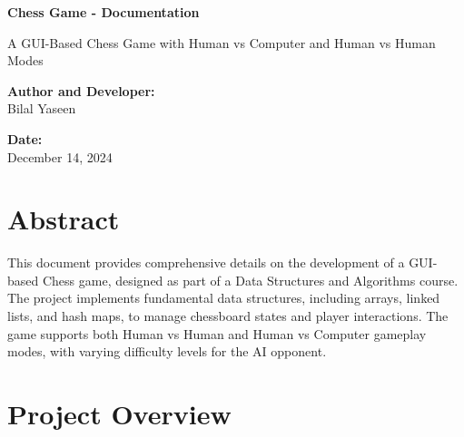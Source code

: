\documentclass[a4paper,12pt]{article}
\begin{document}
\thispagestyle{empty} 

\vspace*{1cm} 

\begin{center}
   \Huge \textbf{Chess Game - Documentation}

    \vspace{0.5cm}
    \Large A GUI-Based Chess Game with Human vs Computer and Human vs Human Modes

    \vspace{1.5cm}
    \textbf{Author and Developer:} \\
    Bilal Yaseen
    
    \vspace{0.5cm}
    \textbf{Date:} \\
    December 14, 2024
\end{center}

\section*{Abstract}
This document provides comprehensive details on the development of a GUI-based Chess game, designed as part of a Data Structures and Algorithms course. The project implements fundamental data structures, including arrays, linked lists, and hash maps, to manage chessboard states and player interactions. The game supports both Human vs Human and Human vs Computer gameplay modes, with varying difficulty levels for the AI opponent.


\newpage


\renewcommand{\contentsname}{Table of Contents}

\tableofcontents

\newpage

\thispagestyle{empty}

\listoffigures

\newpage

\thispagestyle{empty}

\listoftables

\newpage

\pagestyle{fancy}
\fancyhf{}
\fancyfoot[R]{{\thepage}}

\section{Project Overview}
\end{document}
